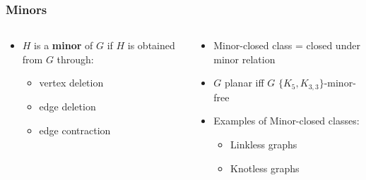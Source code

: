 \documentclass[english]{beamer}
\begin{document}
\begin{frame}
  \frametitle{Minors}
  \begin{columns}
    \begin{column}{0.5\textwidth}
        \begin{itemize}
          \item $H$ is a \textbf{minor} of $G$ if $H$ is obtained from $G$ through:
          \begin{itemize}
            \item vertex deletion
            \item edge deletion
            \item edge contraction
          \end{itemize}
          \begin{figure}
            \centering
            
          \end{figure}
        \end{itemize}
    \end{column}
    \pause
      \begin{column}{0.5\textwidth}
        \begin{itemize}
          \item Minor-closed class = closed under minor relation
          \item $G$ planar iff $G$ $\{K_5, K_{3,3}\}$-minor-free \cite{kuratowskiProblemeCourbesGauches1930,wagnerUeberEigenschaftEbenen1937}
          \item Examples of Minor-closed classes:
          \begin{itemize}
            \item Linkless graphs
            \item Knotless graphs
          \end{itemize}
        \end{itemize}
    \end{column}
  \end{columns}
\end{frame}
\end{document}
